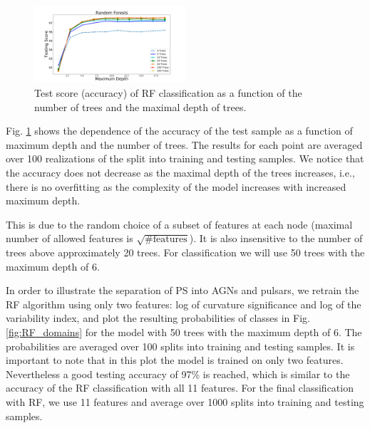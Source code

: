 \begin{figure}[h]
\centering
\hspace*{-0.5cm}
\includegraphics[width=0.5\textwidth]{plots/rf_train_assocnewfeats.pdf}
\caption{
Test score (accuracy) of RF classification as a function of the number of trees and 
the maximal depth of trees.
}
\label{fig:RF_complexity}
\end{figure}

Fig. \ref{fig:RF_complexity} shows the dependence of the accuracy of the test sample as a function of maximum depth and the number of trees. 
The results for each point are averaged over 100 realizations of the split into training and testing samples.
We notice that the accuracy does not decrease as the maximal depth of the trees increases, i.e., there is no overfitting as the complexity of the model increases with increased maximum depth.

This is due to the random choice of a subset of features at each node (maximal number of allowed features is $\sqrt{\text{\# features}}$).
It is also insensitive to the number of trees above approximately 20 trees.
For classification we will use 50 trees with the maximum depth of 6.


In order to illustrate the separation of PS into AGNs and pulsars, we retrain the RF algorithm using only two features: log of curvature significance and log of the variability index, and plot the resulting probabilities of classes in Fig. \ref{fig:RF_domains}
for the model with 50 trees with the maximum depth of 6.
The probabilities are averaged over 100 splits into training and testing samples.
It is important to note that in this plot the model is trained on only two features. Nevertheless a good testing accuracy of 97\% is reached, 
which is similar to the accuracy of the RF classification with all 11 features.
For the final classification with RF, we use 11 features and average over 1000 splits into training and testing samples.

